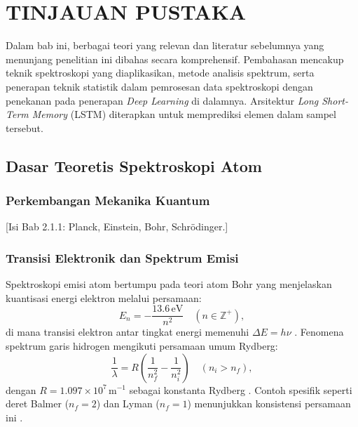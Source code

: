 


\chapter{TINJAUAN PUSTAKA}
\par Dalam bab ini, berbagai teori yang relevan dan literatur sebelumnya yang menunjang penelitian ini dibahas secara komprehensif. Pembahasan mencakup teknik spektroskopi yang diaplikasikan, metode analisis spektrum, serta penerapan teknik statistik dalam pemrosesan data spektroskopi dengan penekanan pada penerapan \textit{Deep Learning} di dalamnya. Arsitektur \textit{Long Short-Term Memory} (LSTM) diterapkan untuk memprediksi elemen dalam sampel tersebut.

\section{Dasar Teoretis Spektroskopi Atom}
\subsection{Perkembangan Mekanika Kuantum}
[Isi Bab 2.1.1: Planck, Einstein, Bohr, Schrödinger.]

\subsection{Transisi Elektronik dan Spektrum Emisi}
Spektroskopi emisi atom bertumpu pada teori atom Bohr yang menjelaskan kuantisasi energi elektron melalui persamaan:
\begin{equation}
E_n = -\frac{13.6 \, \text{eV}}{n^2} \quad (n \in \mathbb{Z}^+),
\end{equation}
di mana transisi elektron antar tingkat energi memenuhi $\Delta E = h\nu$ \cite{Beiser1992}. Fenomena spektrum garis hidrogen mengikuti persamaan umum Rydberg:
\begin{equation}
\frac{1}{\lambda} = R \left( \frac{1}{n_f^2} - \frac{1}{n_i^2} \right) \quad (n_i > n_f),
\end{equation}
dengan $R = 1.097 \times 10^7 \, \text{m}^{-1}$ sebagai konstanta Rydberg \cite{Beiser1992}. Contoh spesifik seperti deret Balmer ($n_f = 2$) dan Lyman ($n_f = 1$) menunjukkan konsistensi persamaan ini \cite{Griffiths2005}.

